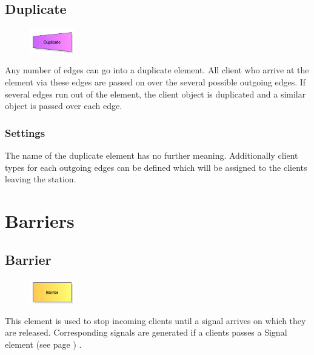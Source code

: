 \section{Duplicate}
\label{ref:ModelElementDuplicate}

\begin{figure}
\vspace{-22pt}
\includegraphics[width=2cm]{imageModelElementDuplicate.png}
\vspace{-22pt}
\end{figure}

Any number of edges can go into a duplicate element. All client who arrive at the element via these edges are passed on over
the several possible outgoing edges. If several edges run out of the element, the client object is duplicated and a
similar object is passed over each edge.

\subsection*{Settings}

The name of the duplicate element has no further meaning. Additionally client types for each outgoing edges can be
defined which will be assigned to the clients leaving the station.





\chapter{Barriers}

\section{Barrier}
\label{ref:ModelElementBarrier}

\begin{figure}
\vspace{-22pt}
\includegraphics[width=2cm]{imageModelElementBarrier.png}
\vspace{-22pt}
\end{figure}

This element is used to stop incoming clients until a signal arrives on which they are released.
Corresponding signals are generated if a clients passes a
Signal element (see page \pageref{ref:ModelElementSignal}) .

